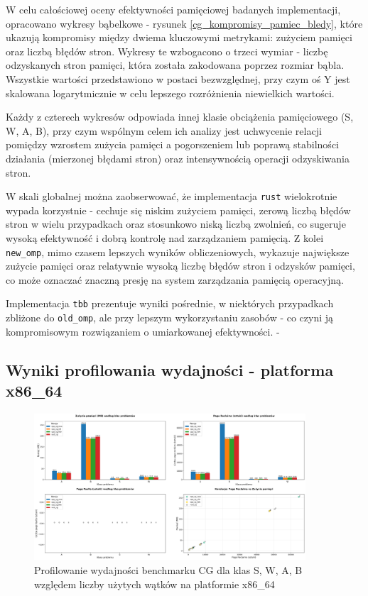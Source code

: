 W celu całościowej oceny efektywności pamięciowej badanych implementacji, opracowano wykresy bąbelkowe - rysunek \ref{cg_kompromisy_pamiec_bledy}, które ukazują kompromisy między dwiema kluczowymi metrykami: zużyciem pamięci oraz liczbą błędów stron. Wykresy te wzbogacono o trzeci wymiar - liczbę odzyskanych stron pamięci, która została zakodowana poprzez rozmiar bąbla. Wszystkie wartości przedstawiono w postaci bezwzględnej, przy czym oś Y jest skalowana logarytmicznie w celu lepszego rozróżnienia niewielkich wartości.

Każdy z czterech wykresów odpowiada innej klasie obciążenia pamięciowego (S, W, A, B), przy czym wspólnym celem ich analizy jest uchwycenie relacji pomiędzy wzrostem zużycia pamięci a pogorszeniem lub poprawą stabilności działania (mierzonej błędami stron) oraz intensywnością operacji odzyskiwania stron.

W skali globalnej można zaobserwować, że implementacja \texttt{rust} wielokrotnie wypada korzystnie - cechuje się niskim zużyciem pamięci, zerową liczbą błędów stron w wielu przypadkach oraz stosunkowo niską liczbą zwolnień, co sugeruje wysoką efektywność i dobrą kontrolę nad zarządzaniem pamięcią. Z kolei \texttt{new\_omp}, mimo czasem lepszych wyników obliczeniowych, wykazuje największe zużycie pamięci oraz relatywnie wysoką liczbę błędów stron i odzysków pamięci, co może oznaczać znaczną presję na system zarządzania pamięcią operacyjną.

Implementacja \texttt{tbb} prezentuje wyniki pośrednie, w niektórych przypadkach zbliżone do \texttt{old\_omp}, ale przy lepszym wykorzystaniu zasobów - co czyni ją kompromisowym rozwiązaniem o umiarkowanej efektywności.
-
\subsection{Wyniki profilowania wydajności - platforma x86\_64}
\begin{figure}[H]
    \centering
    \includegraphics[width=0.9\textwidth]{analiza/images/parallel/cg/x86/chart_01_memory_comparison.png}
    \caption{Profilowanie wydajności benchmarku CG dla klas S, W, A, B względem liczby użytych wątków na platformie x86\_64}
    \label{cg_porownanie_zuzycia_pamieci_x86_64}
\end{figure}

